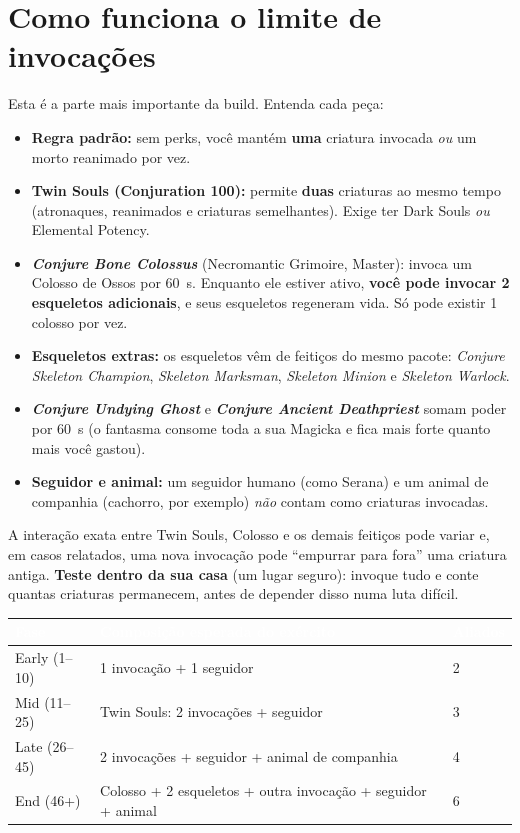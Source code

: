 \documentclass[11pt,a4paper,oneside,openany]{book}
\newcommand{\magia}[1]{\textit{\textcolor{SoulCairnPurple}{#1}}}
\newcommand{\perk}[1]{\textsf{\textcolor{SoulCairnPurple}{#1}}}
\newcommand{\cabec}[1]{\textcolor{white}{\sffamily\bfseries\small #1}}
\newcommand{\tabhead}{\rowcolor{NecroEmerald}}
\begin{document}
\section{Como funciona o limite de invocações}
Esta é a parte mais importante da build. Entenda cada peça:

\begin{itemize}
  \item \textbf{Regra padrão:} sem perks, você mantém \textbf{uma} criatura invocada \emph{ou} um morto reanimado por vez.
  \item \textbf{\perk{Twin Souls} (Conjuration 100):} permite \textbf{duas} criaturas ao mesmo tempo (atronaques, reanimados e criaturas semelhantes). Exige ter \perk{Dark Souls} \emph{ou} \perk{Elemental Potency}.
  \item \textbf{\magia{Conjure Bone Colossus}} (Necromantic Grimoire, Master): invoca um Colosso de Ossos por 60~s. Enquanto ele estiver ativo, \textbf{você pode invocar 2 esqueletos adicionais}, e seus esqueletos regeneram vida. Só pode existir 1 colosso por vez.
  \item \textbf{Esqueletos extras:} os esqueletos vêm de feitiços do mesmo pacote: \magia{Conjure Skeleton Champion}, \magia{Skeleton Marksman}, \magia{Skeleton Minion} e \magia{Skeleton Warlock}.
  \item \textbf{\magia{Conjure Undying Ghost}} e \textbf{\magia{Conjure Ancient Deathpriest}} somam poder por 60~s (o fantasma consome toda a sua Magicka e fica mais forte quanto mais você gastou).
  \item \textbf{Seguidor e animal:} um seguidor humano (como Serana) e um animal de companhia (cachorro, por exemplo) \emph{não} contam como criaturas invocadas.
\end{itemize}

\begin{alerta}
A interação exata entre Twin Souls, Colosso e os demais feitiços pode variar e, em casos relatados, uma nova invocação pode ``empurrar para fora'' uma criatura antiga. \textbf{Teste dentro da sua casa} (um lugar seguro): invoque tudo e conte quantas criaturas permanecem, antes de depender disso numa luta difícil.
\end{alerta}

\begin{center}
\begin{tabularx}{\linewidth}{@{}L{2.3cm}Y L{2.5cm}@{}}
\tabhead \cabec{Fase} & \cabec{Composição esperada do exército} & \cabec{Aliados} \\
\toprule
Early (1--10) & 1 invocação + 1 seguidor & 2 \\
Mid (11--25) & Twin Souls: 2 invocações + seguidor & 3 \\
Late (26--45) & 2 invocações + seguidor + animal de companhia & 4 \\
End (46+) & Colosso + 2 esqueletos + outra invocação + seguidor + animal & 6 \\
\bottomrule
\end{tabularx}
\end{center}
\end{document}
